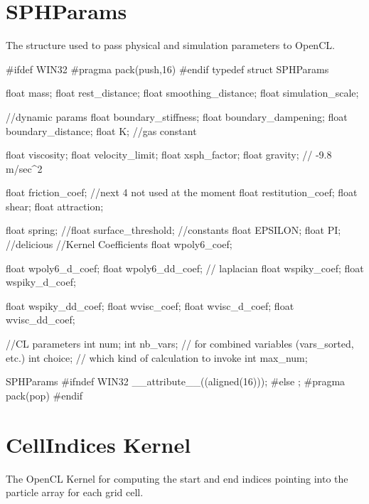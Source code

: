 \section{SPHParams}
The structure used to pass physical and simulation parameters to OpenCL.
\begin{cppcode}{0}

#ifdef WIN32
#pragma pack(push,16)
#endif
typedef struct SPHParams
    {
        float mass;
        float rest_distance;
        float smoothing_distance;
        float simulation_scale;

        //dynamic params
        float boundary_stiffness;
        float boundary_dampening;
        float boundary_distance;
        float K;        //gas constant

        float viscosity;
        float velocity_limit;
        float xsph_factor;
        float gravity; // -9.8 m/sec^2

        float friction_coef;
        //next 4 not used at the moment
        float restitution_coef;
        float shear;
        float attraction;

        float spring;
        //float surface_threshold;
        //constants
        float EPSILON;
        float PI;       //delicious
        //Kernel Coefficients
        float wpoly6_coef;

        float wpoly6_d_coef;
        float wpoly6_dd_coef; // laplacian
        float wspiky_coef;
        float wspiky_d_coef;

        float wspiky_dd_coef;
        float wvisc_coef;
        float wvisc_d_coef;
        float wvisc_dd_coef;


        //CL parameters
        int num;
        int nb_vars; // for combined variables (vars_sorted, etc.)
        int choice; // which kind of calculation to invoke
        int max_num;

 } SPHParams
#ifndef WIN32
    __attribute__((aligned(16)));
#else
        ;
        #pragma pack(pop)
#endif

\end{cppcode}

\section{CellIndices Kernel}
The OpenCL Kernel for computing the start and end indices pointing into the
particle array for each grid cell.

